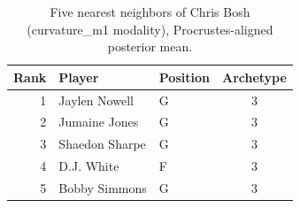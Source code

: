 \begin{table}[htbp]
  \centering\small
  \begin{tabular}{rllc}
    \toprule
    Rank & Player & Position & Archetype \\
    \midrule
    1 & Jaylen Nowell & G & 3 \\
    2 & Jumaine Jones & G & 3 \\
    3 & Shaedon Sharpe & G & 3 \\
    4 & D.J. White & F & 3 \\
    5 & Bobby Simmons & G & 3 \\
    \bottomrule
  \end{tabular}
  \caption{Five nearest neighbors of Chris Bosh (curvature_m1 modality), Procrustes-aligned posterior mean.}
  \label{tab:Chris_Bosh_neighbors_curvature_m1}
\end{table}

